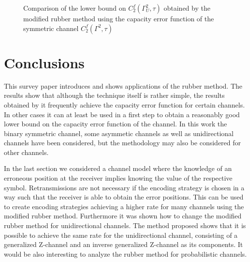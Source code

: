 \documentclass[conference]{IEEEtran}
\begin{document}
\begin{figure}
    \centering
    \scalebox{0.65}{
    }
    \caption{Comparison of the lower bound on $C_2^f(\Gamma_U^2,\tau)$ obtained by the modified rubber method using the capacity error function of the symmetric channel $C_2^f(\Gamma^2,\tau)$}
    \label{fig:comparison_Berlekamp}
    \vspace{-1em}
\end{figure}

\section{Conclusions}
This survey paper introduces and shows applications of the rubber method. The results show that although the technique itself is rather simple, the results obtained by it frequently achieve the capacity error function for certain channels. In other cases it can at least be used in a first step to obtain a reasonably good lower bound on the capacity error function of the channel. In this work the binary symmetric channel, some asymmetic channels as well as unidirectional channels have been considered, but the methodology may also be considered for other channels.

In the last section we considered a channel model
where the knowledge of an erroneous position at the receiver implies knowing the value of the respective symbol. Retransmissions are not necessary if the encoding strategy is chosen in a way such that the receiver is able to obtain the error positions. This can be used to create encoding strategies achieving a higher rate for many channels using the modified rubber method. Furthermore it was shown how to change the modified rubber method for unidirectional channels. The method proposed shows that it is possible to achieve the same rate for the unidirectional channel, consisting of a generalized Z-channel and an inverse generalized Z-channel as its components.
 It would be also interesting to analyze the rubber method for probabilistic channels.
\end{document}
